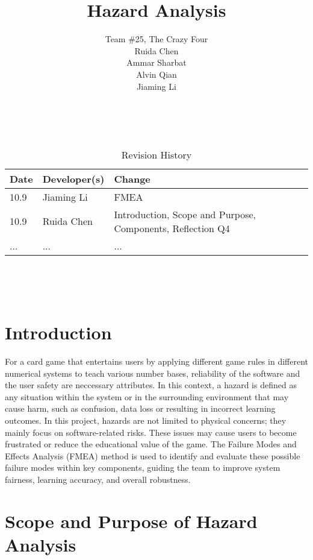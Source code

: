 \documentclass{article}
\title{Hazard Analysis\\\progname}
\author{
    Team \#25, The Crazy Four \\[1ex]
    Ruida Chen \\
    Ammar Sharbat \\
    Alvin Qian \\
    Jiaming Li
}
\date{}
\begin{document}
\maketitle
\thispagestyle{empty}

~\newpage


\begin{table}[hp]
\caption{Revision History} \label{TblRevisionHistory}
\begin{tabularx}{\textwidth}{llX}
\toprule
\textbf{Date} & \textbf{Developer(s)} & \textbf{Change}\\
\midrule
10.9 & Jiaming Li & FMEA\\
10.9 & Ruida Chen & Introduction, Scope and Purpose, Components, Reflection Q4\\
... & ... & ...\\
\bottomrule
\end{tabularx}
\end{table}

~\newpage

\tableofcontents

~\newpage



\section{Introduction}

For a card game that entertains users by applying different game rules in different numerical systems to teach various number bases, reliability of the software and the user safety are neccessary attributes. In this context, a hazard is defined as any situation within the system or in the surrounding environment that may cause harm, such as confusion, data loss or resulting in incorrect learning outcomes. In this project, hazards are not limited to physical concerns; they mainly focus on software-related risks. These issues may cause users to become frustrated or reduce the educational value of the game. The Failure Modes and Effects Analysis (FMEA) method is used to identify and evaluate these possible failure modes within key components, guiding the team to improve system fairness, learning accuracy, and overall robustness.

\section{Scope and Purpose of Hazard Analysis}
\end{document}
